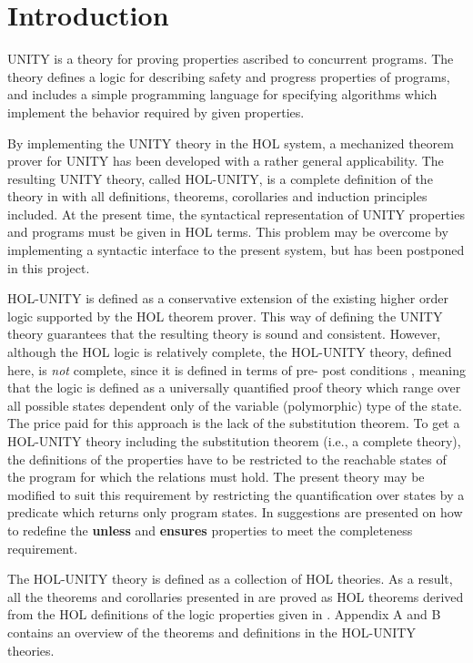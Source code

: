 \cleardoublepage
\chapter{Introduction}

UNITY is a theory for proving properties ascribed to concurrent programs.  The
theory defines a logic for describing safety and progress properties of
programs, and includes a simple programming language for specifying algorithms
which implement the behavior required by given properties.

By implementing the UNITY theory in the HOL system, a mechanized theorem prover
for UNITY has been developed with a rather general applicability.  The
resulting UNITY theory, called HOL-UNITY, is a complete definition of the
theory in \cite{CM88} with all definitions, theorems, corollaries and induction
principles included.  At the present time, the syntactical representation of
UNITY properties and programs must be given in HOL terms.  This problem may be
overcome by implementing a syntactic interface to the present system, but has
been postponed in this project.

HOL-UNITY is defined as a conservative extension of the existing higher order
logic supported by the HOL theorem prover.  This way of defining the UNITY
theory guarantees that the resulting theory is sound and consistent.  However,
although the HOL logic is relatively complete, the HOL-UNITY theory, defined
here, is {\it not} complete, since it is defined in terms of pre- post
conditions \cite{Hoare69,Dijk76}, meaning that the logic is defined as a
universally quantified proof theory which range over all possible states
dependent only of the variable (polymorphic) type of the state.  The price paid
for this approach is the lack of the substitution theorem.  To get a HOL-UNITY
theory including the substitution theorem (i.e., a complete theory), the
definitions of the properties have to be restricted to the reachable states of
the program for which the relations must hold.  The present theory may be
modified to suit this requirement by restricting the quantification over states
by a predicate which returns only program states.  In \cite{BS90a,Mi90,FA92}
suggestions are presented on how to redefine the {\bf unless} and {\bf ensures}
properties to meet the completeness requirement.

\bigskip
The HOL-UNITY theory is defined as a collection of HOL theories.  As a result,
all the theorems and corollaries presented in \cite{CM88} are proved as HOL
theorems derived from the HOL definitions of the logic properties given in
\cite{CM88}.  Appendix A and B contains an overview of the theorems and
definitions in the HOL-UNITY theories.

